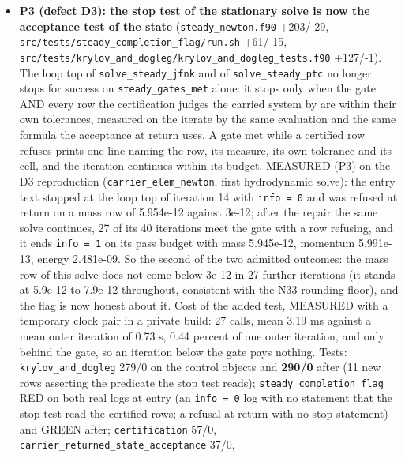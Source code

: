 \documentclass[english,a4paper]{my_memo}
\begin{document}
\begin{itemize}
  stated: a bounded pass advances less, so the frozen H2 residual after the
  composition update is larger (4.4708e-01 at trust 0.01 against the entry
  text\textquotesingle s 3.1897e-01, from 4.9275e-01 before), and the state handed on is
  correspondingly closer to the entry state.
\item
  \textbf{P3 (defect D3): the stop test of the stationary solve is now the
  acceptance test of the state} (\texttt{steady\_newton.f90} +203/-29,
  \texttt{src/tests/steady\_completion\_flag/run.sh} +61/-15,
  \texttt{src/tests/krylov\_and\_dogleg/krylov\_and\_dogleg\_tests.f90} +127/-1). The loop
  top of \texttt{solve\_steady\_jfnk} and of \texttt{solve\_steady\_ptc} no longer stops for
  success on \texttt{steady\_gates\_met} alone: it stops only when the gate AND every
  row the certification judges the carried system by are within their own
  tolerances, measured on the iterate by the same evaluation and the same
  formula the acceptance at return uses. A gate met while a certified row
  refuses prints one line naming the row, its measure, its own tolerance and
  its cell, and the iteration continues within its budget. MEASURED (P3) on
  the D3 reproduction (\texttt{carrier\_elem\_newton}, first hydrodynamic solve): the
  entry text stopped at the loop top of iteration 14 with \texttt{info\ =\ 0} and was
  refused at return on a mass row of 5.954e-12 against 3e-12; after the
  repair the same solve continues, 27 of its 40 iterations meet the gate with
  a row refusing, and it ends \texttt{info\ =\ 1} on its pass budget with mass
  5.945e-12, momentum 5.991e-13, energy 2.481e-09. So the second of the two
  admitted outcomes: the mass row of this solve does not come below 3e-12 in 27
  further iterations (it stands at 5.9e-12 to 7.9e-12 throughout, consistent
  with the N33 rounding floor), and the flag is now honest about it. Cost of
  the added test, MEASURED with a temporary clock pair in a private build: 27
  calls, mean 3.19 ms against a mean outer iteration of 0.73 s, 0.44 percent
  of one outer iteration, and only behind the gate, so an iteration below the
  gate pays nothing. Tests: \texttt{krylov\_and\_dogleg} 279/0 on the control objects
  and \textbf{290/0} after (11 new rows asserting the predicate the stop test
  reads); \texttt{steady\_completion\_flag} RED on both real logs at entry (an
  \texttt{info\ =\ 0} log with no statement that the stop test read the certified rows;
  a refusal at return with no stop statement) and GREEN after;
  \texttt{certification} 57/0, \texttt{carrier\_returned\_state\_acceptance} 37/0,

\end{itemize}
\end{document}
